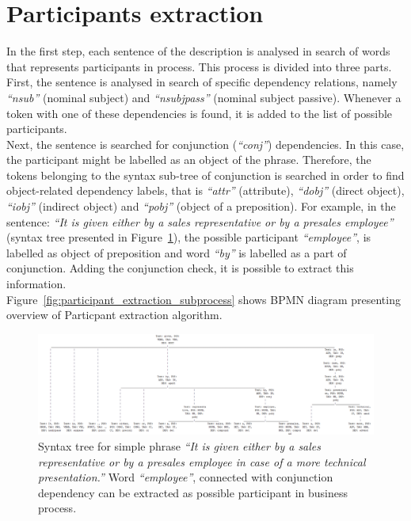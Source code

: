 \section{Participants extraction}
\label{sec:participant}
In the first step, each sentence of the description is analysed in search of words that represents participants in process. This process is divided into three parts.\\
First, the sentence is analysed in search of specific dependency relations, namely \emph{``nsub''} (nominal subject) and \emph{``nsubjpass''} (nominal subject passive). Whenever a token with one of these dependencies is found, it is added to the list of possible participants.\\
Next, the sentence is searched for conjunction (\emph{``conj''}) dependencies. In this case, the participant might be labelled as an object of the phrase. Therefore, the tokens belonging to the syntax sub-tree of conjunction is searched in order to find object-related dependency labels, that is \emph{``attr''} (attribute), \emph{``dobj''} (direct object), \emph{``iobj''} (indirect object) and \emph{``pobj''} (object of a preposition). For example, in the sentence: \emph{``It is given either by a sales representative or by a presales employee''} (syntax tree presented in Figure~\ref{fig:participant_conj_example}), the possible participant \emph{``employee''}, is labelled as object of preposition and word \emph{``by''} is labelled as a part of conjunction. Adding the conjunction check, it is possible to extract this information.\\
Figure~\ref{fig:participant_extraction_subprocess} shows BPMN diagram presenting overview of Particpant extraction algorithm.
\begin{figure}[H]
	\centering
	\includegraphics[width=\textwidth]{./images/participant_conj_example.pdf}
	\caption{Syntax tree for simple phrase \emph{``It is given either by a sales representative or by a presales employee in case of a more technical presentation.''} Word \emph{``employee''}, connected with conjunction dependency can be extracted as possible participant in business process.}
	\label{fig:participant_conj_example}
\end{figure}
